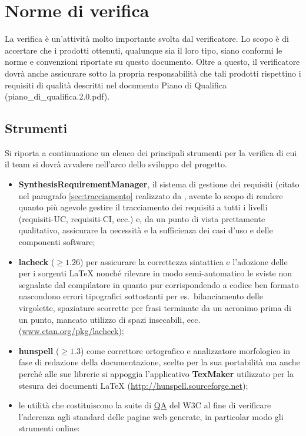 {\newpage
\section{Norme di verifica}
La verifica è un'attività molto importante svolta dal verificatore. Lo scopo è di accertare che i prodotti ottenuti, qualunque sia il loro tipo, siano conformi le norme e convenzioni riportate su questo documento. Oltre a questo, il verificatore dovrà anche assicurare sotto la propria responsabilità che tali prodotti rispettino i requisiti di qualità descritti nel documento Piano di Qualifica (piano\_di\_qualifica.2.0.pdf).

\subsection{Strumenti}\label{sec:tools}
Si riporta a continuazione un elenco dei principali strumenti per la verifica di cui il team si dovrà avvalere nell'arco dello sviluppo del progetto.
\begin{itemize}
  \item \textbf{SynthesisRequirementManager}, il sistema di gestione dei requisiti (citato nel paragrafo \ref{sec:tracciamento} realizzato da \team, avente lo scopo di rendere quanto più agevole gestire il tracciamento dei requisiti a tutti i livelli (requisiti-UC, requisiti-CI, ecc.) e, da un punto di vista prettamente qualitativo, assicurare la necessità e la sufficienza dei casi d'uso e delle componenti software;
 \item \textbf{lacheck} ($\geq 1.26$) per assicurare la correttezza sintattica e l'adozione delle  per i sorgenti \LaTeX{} nonché rilevare in modo semi-automatico le sviste non segnalate dal compilatore in quanto pur corrispondendo a codice ben formato nascondono errori tipografici sottostanti per es.~bilanciamento delle virgolette, spaziature scorrette per frasi terminate da un acronimo prima di un punto, mancato utilizzo di spazi insecabili, ecc. (\url{www.ctan.org/pkg/lacheck});
 \item \textbf{hunspell} ($\geq 1.3$) come correttore ortografico e analizzatore morfologico in fase di redazione della documentazione, scelto per la sua portabilità ma anche perché alle sue librerie si appoggia l'applicativo \textbf{TexMaker} utilizzato per la stesura dei documenti \LaTeX{} (\url{http://hunspell.sourceforge.net});
 \item le utilità che costituiscono la suite di \underline{QA} del W3C al fine di verificare l'aderenza agli standard delle pagine web generate, in particolar modo gli strumenti online:

\end{itemize}}
